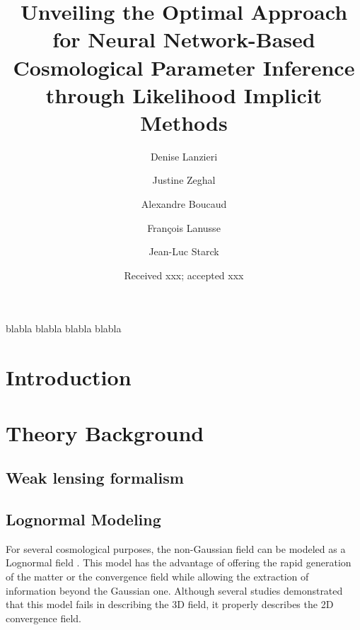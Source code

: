 \documentclass{aa}
\begin{document}
 

\title{Unveiling the Optimal Approach for Neural Network-Based Cosmological Parameter Inference through Likelihood Implicit Methods}


\newcommand{\justine}[1]{{\color{cyan}JZ: #1}}
\newcommand{\denise}[1]{{\color{red}DL: #1}}

\author{Denise Lanzieri 
\and
Justine Zeghal 
\and
Alexandre Boucaud 
\and
Fran\c{c}ois Lanusse 
\and
Jean-Luc Starck 
}
\titlerunning{}
\date{Received xxx; accepted xxx}


 
  \abstract
   {blabla}
    {blabla}
    {blabla}
   {blabla}
   {}


   \maketitle
%

\section{Introduction}
\section{Theory Background}
\subsection{Weak lensing formalism}
\subsection{Lognormal Modeling}
For several cosmological purposes, the non-Gaussian field can be modeled as a Lognormal field \citep{coles1991lognormal,bohm2017bayesian}.
This model has the advantage of offering the rapid generation of the matter or the convergence field while allowing the extraction of information beyond the Gaussian one. 
Although several studies demonstrated that this model fails in describing the 3D field, it properly describes the 2D convergence field.
\end{document}
